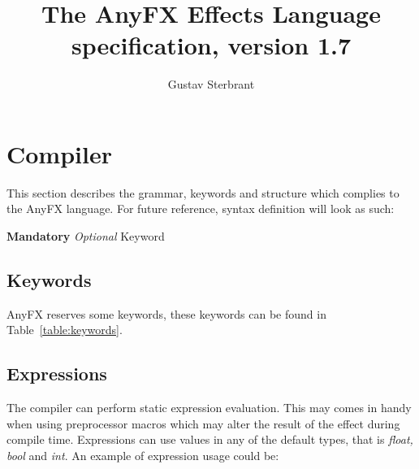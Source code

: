 \documentclass{article}
\newcommand{\SyntaxBox}[1]
{	
	\begin{center}
	\colorbox{orange!60}
	{
		\begin{minipage}{\linewidth}
		\hfill
		\begin{tabbing}
		#1
		\end{tabbing}
		\end{minipage}
	}
	\end{center}
}
\begin{document}
\title{The AnyFX Effects Language specification, version 1.7}
\author{Gustav Sterbrant}
\date{}
\maketitle

\clearpage
\tableofcontents
\clearpage

\section{Compiler}
This section describes the grammar, keywords and structure which complies to the AnyFX language. For future reference, syntax definition will look as such:

\SyntaxBox
{
	\textbf{Mandatory} \textit{Optional} Keyword
}

\subsection{Keywords}
AnyFX reserves some keywords, these keywords can be found in Table~\ref{table:keywords}.

\begin{table}[hp]
\centering
\caption{Keywords}
\label{table:keywords}
\end{table}

\subsection{Expressions}
The compiler can perform static expression evaluation. This may comes in handy when using preprocessor macros which may alter the result of the effect during compile time. Expressions can use values in any of the default types, that is \textit{float, bool} and \textit{int}. An example of expression usage could be:
\end{document}
